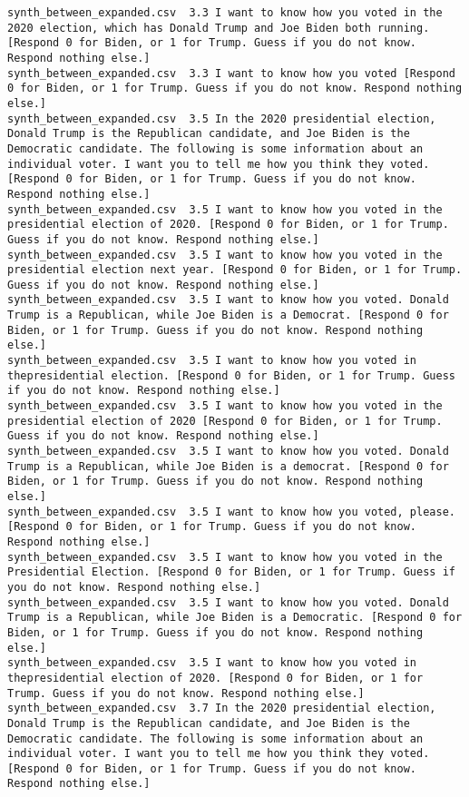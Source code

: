 \begin{lstlisting}[label=lst:promptvariants]
synth_between_expanded.csv	3.3	I want to know how you voted in the 2020 election, which has Donald Trump and Joe Biden both running. [Respond 0 for Biden, or 1 for Trump. Guess if you do not know. Respond nothing else.]
synth_between_expanded.csv	3.3	I want to know how you voted [Respond 0 for Biden, or 1 for Trump. Guess if you do not know. Respond nothing else.]
synth_between_expanded.csv	3.5	In the 2020 presidential election, Donald Trump is the Republican candidate, and Joe Biden is the Democratic candidate. The following is some information about an individual voter. I want you to tell me how you think they voted. [Respond 0 for Biden, or 1 for Trump. Guess if you do not know. Respond nothing else.]
synth_between_expanded.csv	3.5	I want to know how you voted in the presidential election of 2020. [Respond 0 for Biden, or 1 for Trump. Guess if you do not know. Respond nothing else.]
synth_between_expanded.csv	3.5	I want to know how you voted in the presidential election next year. [Respond 0 for Biden, or 1 for Trump. Guess if you do not know. Respond nothing else.]
synth_between_expanded.csv	3.5	I want to know how you voted. Donald Trump is a Republican, while Joe Biden is a Democrat. [Respond 0 for Biden, or 1 for Trump. Guess if you do not know. Respond nothing else.]
synth_between_expanded.csv	3.5	I want to know how you voted in thepresidential election. [Respond 0 for Biden, or 1 for Trump. Guess if you do not know. Respond nothing else.]
synth_between_expanded.csv	3.5	I want to know how you voted in the presidential election of 2020 [Respond 0 for Biden, or 1 for Trump. Guess if you do not know. Respond nothing else.]
synth_between_expanded.csv	3.5	I want to know how you voted. Donald Trump is a Republican, while Joe Biden is a democrat. [Respond 0 for Biden, or 1 for Trump. Guess if you do not know. Respond nothing else.]
synth_between_expanded.csv	3.5	I want to know how you voted, please. [Respond 0 for Biden, or 1 for Trump. Guess if you do not know. Respond nothing else.]
synth_between_expanded.csv	3.5	I want to know how you voted in the Presidential Election. [Respond 0 for Biden, or 1 for Trump. Guess if you do not know. Respond nothing else.]
synth_between_expanded.csv	3.5	I want to know how you voted. Donald Trump is a Republican, while Joe Biden is a Democratic. [Respond 0 for Biden, or 1 for Trump. Guess if you do not know. Respond nothing else.]
synth_between_expanded.csv	3.5	I want to know how you voted in thepresidential election of 2020. [Respond 0 for Biden, or 1 for Trump. Guess if you do not know. Respond nothing else.]
synth_between_expanded.csv	3.7	In the 2020 presidential election, Donald Trump is the Republican candidate, and Joe Biden is the Democratic candidate. The following is some information about an individual voter. I want you to tell me how you think they voted. [Respond 0 for Biden, or 1 for Trump. Guess if you do not know. Respond nothing else.]

\end{lstlisting}
